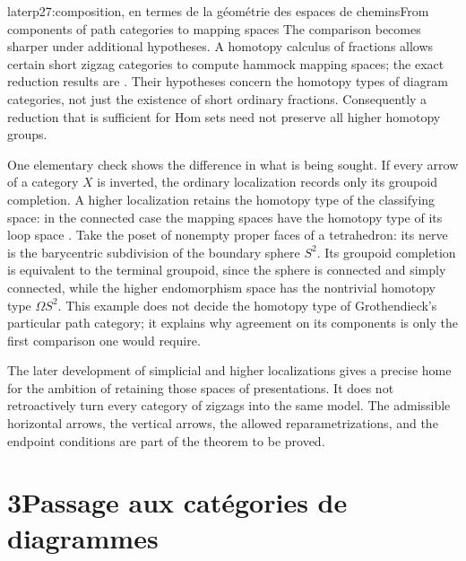 \begin{dcomment}{later}{p27:composition, en termes de la géométrie des espaces de chemins}{From components of path categories to mapping spaces}
The comparison becomes sharper under additional hypotheses. A homotopy calculus of fractions allows certain short zigzag categories to compute hammock mapping spaces; the exact reduction results are \citet[Proposition~6.2]{DwyerKan1980Calculating}. Their hypotheses concern the homotopy types of diagram categories, not just the existence of short ordinary fractions. Consequently a reduction that is sufficient for Hom sets need not preserve all higher homotopy groups.

One elementary check shows the difference in what is being sought. If every arrow of a category $X$ is inverted, the ordinary localization records only its groupoid completion. A higher localization retains the homotopy type of the classifying space: in the connected case the mapping spaces have the homotopy type of its loop space \citep[\S5.5]{DwyerKan1980Simplicial}. Take the poset of nonempty proper faces of a tetrahedron: its nerve is the barycentric subdivision of the boundary sphere $S^2$. Its groupoid completion is equivalent to the terminal groupoid, since the sphere is connected and simply connected, while the higher endomorphism space has the nontrivial homotopy type $\Omega S^2$. This example does not decide the homotopy type of Grothendieck's particular path category; it explains why agreement on its components is only the first comparison one would require.

The later development of simplicial and higher localizations gives a precise home for the ambition of retaining those spaces of presentations. It does not retroactively turn every category of zigzags into the same model. The admissible horizontal arrows, the vertical arrows, the allowed reparametrizations, and the endpoint conditions are part of the theorem to be proved.
\end{dcomment}


\noindent{}

\section*{3\quad Passage aux catégories de diagrammes}

